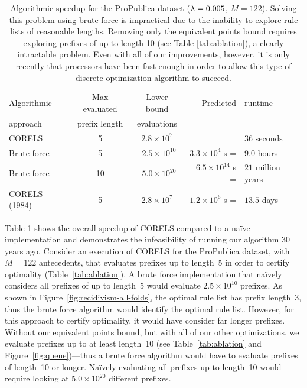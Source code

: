 \begin{table}[b!]
\vspace{5mm}
\centering
\begin{tabular}{l|c|c|r l}
Algorithmic & Max evaluated & Lower bound & Predicted&runtime \\
approach & prefix length & evaluations & \\
\hline
CORELS & 5  & $ 2.8 \times 10^7$ & &$36$ seconds \\
Brute force & 5 & ~$2.5 \times 10^{10}$ & $3.3 \times 10^4$ s =&$9.0$ hours \\
Brute force & 10 & ~$5.0 \times 10^{20}$ & $6.5 \times 10^{14}$ s =&$21$ million years \\
CORELS (1984) & 5 & $2.8 \times 10^7$ & $1.2 \times 10^6$ s =&$13.5$ days \\
\end{tabular}
\caption{Algorithmic speedup for the ProPublica dataset (${{\lambda} = 0.005}$, ${M = 122}$).
%
Solving this problem using brute force is impractical due to the inability to explore rule lists of reasonable lengths.
%
Removing only the equivalent points bound requires exploring prefixes of up to length 10 (see Table \ref{tab:ablation}), a clearly intractable problem.
%
Even with all of our improvements, however, it is only recently that processors have been fast enough in order to allow this type of discrete optimization algorithm to succeed.
}
\vspace{4mm}
\label{tab:speedup}
\end{table}

Table \ref{tab:speedup} shows the overall speedup of CORELS compared to a na\"ive implementation
and demonstrates the infeasibility of running our algorithm 30 years ago.
%
Consider an execution of CORELS for the ProPublica dataset, with ${M = 122}$ antecedents,
that evaluates prefixes up to length~5 in order to certify optimality (Table~\ref{tab:ablation}).
%
A brute force implementation that na\"ively considers all prefixes of up to length~5
would evaluate ${2.5 \times 10^{10}}$ prefixes.
%
As shown in Figure~\ref{fig:recidivism-all-folds}, the optimal rule list has prefix length~3,
thus the brute force algorithm would identify the optimal rule list.
%
However, for this approach to certify optimality, it would have consider far longer prefixes.
%
Without our equivalent points bound, but with all of our other optimizations,
we evaluate prefixes up to at least length~10
(see Table~\ref{tab:ablation} and Figure~\ref{fig:queue})---thus a brute force algorithm
would have to evaluate prefixes of length~10 or longer.
%
Na\"ively evaluating all prefixes up to length~10 would require looking at ${5.0 \times 10^{20}}$ different prefixes.

